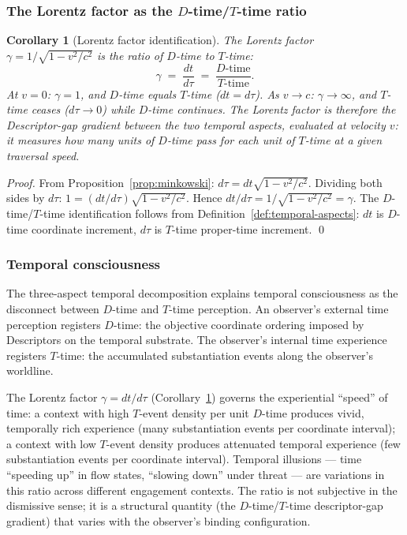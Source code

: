 \documentclass[11pt,a4paper]{article}
\newtheorem{corollary}[theorem]{Corollary}
\theoremstyle{definition}
\theoremstyle{remark}
\begin{document}
\subsubsection{The Lorentz factor as the $D$-time/$T$-time ratio}\label{subsubsec:lorentz-ratio}

\begin{corollary}[Lorentz factor identification]\label{cor:lorentz}
The Lorentz factor $\gamma = 1/\sqrt{1 - v^{2}/c^{2}}$ is the ratio of $D$-time to $T$-time:
\[
\gamma \;=\; \frac{dt}{d\tau} \;=\; \frac{D\text{-time}}{T\text{-time}}.
\]
At $v = 0$: $\gamma = 1$, and $D$-time equals $T$-time ($dt = d\tau$). As $v \to c$: $\gamma \to \infty$, and $T$-time ceases ($d\tau \to 0$) while $D$-time continues. The Lorentz factor is therefore the Descriptor-gap gradient between the two temporal aspects, evaluated at velocity $v$: it measures how many units of $D$-time pass for each unit of $T$-time at a given traversal speed.
\end{corollary}

\begin{proof}
From Proposition~\ref{prop:minkowski}: $d\tau = dt\sqrt{1 - v^{2}/c^{2}}$. Dividing both sides by $d\tau$: $1 = (dt/d\tau)\sqrt{1 - v^{2}/c^{2}}$. Hence $dt/d\tau = 1/\sqrt{1 - v^{2}/c^{2}} = \gamma$. The $D$-time/$T$-time identification follows from Definition~\ref{def:temporal-aspects}: $dt$ is $D$-time coordinate increment, $d\tau$ is $T$-time proper-time increment. \qed
\end{proof}

\subsubsection{Temporal consciousness}\label{subsubsec:temporal-consciousness}

The three-aspect temporal decomposition explains temporal consciousness as the disconnect between $D$-time and $T$-time perception. An observer's external time perception registers $D$-time: the objective coordinate ordering imposed by Descriptors on the temporal substrate. The observer's internal time experience registers $T$-time: the accumulated substantiation events along the observer's worldline.

The Lorentz factor $\gamma = dt/d\tau$ (Corollary~\ref{cor:lorentz}) governs the experiential ``speed'' of time: a context with high $T$-event density per unit $D$-time produces vivid, temporally rich experience (many substantiation events per coordinate interval); a context with low $T$-event density produces attenuated temporal experience (few substantiation events per coordinate interval). Temporal illusions --- time ``speeding up'' in flow states, ``slowing down'' under threat --- are variations in this ratio across different engagement contexts. The ratio is not subjective in the dismissive sense; it is a structural quantity (the $D$-time/$T$-time descriptor-gap gradient) that varies with the observer's binding configuration.
\end{document}
